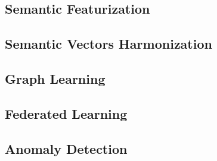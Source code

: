 \subsection{Semantic Featurization}
\subsection{Semantic Vectors Harmonization}
\subsection{Graph Learning}
\subsection{Federated Learning}
\subsection{Anomaly Detection}



